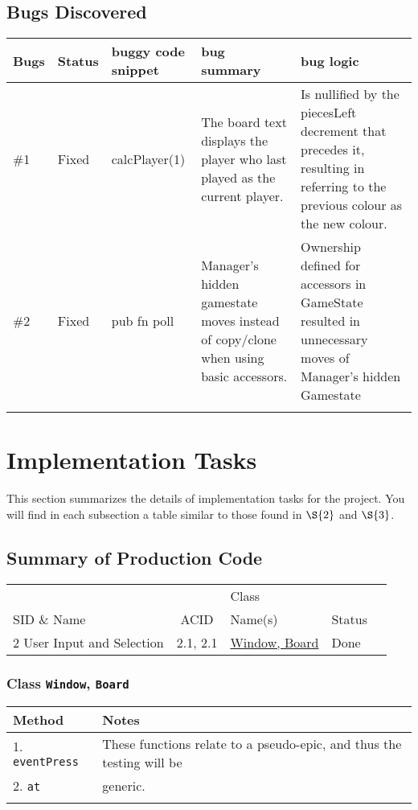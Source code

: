 \documentclass[11pt]{article}
\begin{document}
\subsection{Bugs Discovered}
\label{sec:orgc06f526}
\begin{center}
\begin{tabular}{|l|l|m{2.0cm}|m{3.5cm}|m{5.0cm}|}
Bugs & Status & buggy code snippet & bug summary & bug logic\\
\hline
\#1 & Fixed & calcPlayer(1) & The board text displays the player who last played as the current player. & Is nullified by the piecesLeft decrement that precedes it, resulting in referring to the previous colour as the new colour.\\
\hline
\#2 & Fixed & pub fn poll & Manager's hidden gamestate moves instead of copy/clone when using basic accessors. & Ownership defined for accessors in GameState resulted in unnecessary moves of Manager's hidden Gamestate\\
 &  &  &  & \\
\end{tabular}
\end{center}


\section{Implementation Tasks}
\label{sec:org58c1d6c}
This section summarizes the details of implementation tasks for the project. You will find in each
subsection a table similar to those found in \hyperref[sec:orgd6599cb]{\(\S{2}\)} and \hyperref[sec:org9e6eb22]{\(\S{3}\)}.

\subsection{Summary of Production Code}
\label{sec:orgb0ef9ee}

\begin{center}
\begin{tabular}{|p{4.5cm}|c|p{3.5cm}|p{4.5cm}|c|}
 &  & Class & \\
SID \& Name & ACID & Name(s) & Status\\
\hline
2 User Input and Selection & 2.1, 2.1 & \hyperref[sec:org572a9c0]{Window, Board} & Done\\
\end{tabular}
\end{center}

\subsubsection{Class \texttt{Window}, \texttt{Board}}
\label{sec:org572a9c0}
\begin{center}
\begin{tabular}{|l|l|}
Method & Notes\\
\hline
1. \texttt{eventPress} & These functions relate to a pseudo-epic, and thus the testing will be\\
2. \texttt{at} & generic.\\
 & \\
\end{tabular}
\end{center}
\end{document}
